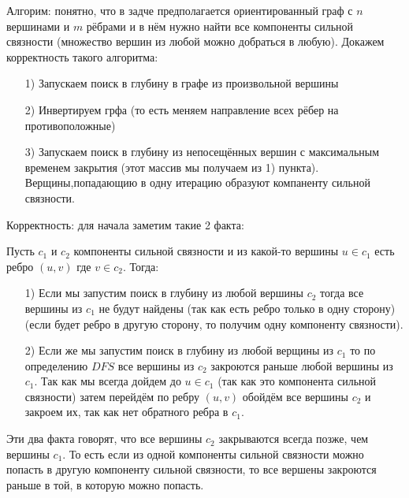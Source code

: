 \documentclass[a4paper,12pt]{article} %
\begin{document}
Алгорим: понятно, что в задче предполагается ориентированный граф с $ n $ вершинами и $ m $ рёбрами и в нём нужно найти все компоненты сильной связности (множество вершин из любой можно добраться в любую). Докажем корректность такого алгоритма:
\begin{itemize}
\item[1) ] Запускаем поиск в глубину в графе из произвольной вершины
\item[2) ] Инвертируем грфа (то есть меняем направление всех рёбер на противоположные)
\item[3) ] Запускаем поиск в глубину из непосещённых вершин с максимальным временем закрытия (этот массив мы получаем из 1) пункта). Верщины,попадающию в одну итерацию образуют компаненту сильной связности. 
\end{itemize}

Корректность: для начала заметим такие 2 факта:
\begin{center}
\end{center}

Пусть $ c_1 $ и $ c_2 $ компоненты сильной связности и из какой-то вершины $ u \in c_1 $ есть ребро $ (u,v) $ где $ v \in c_2 $. Тогда:
\begin{itemize}
\item[1) ]  Если мы запустим поиск в глубину из любой вершины $ c_2 $ тогда все вершины из $ c_1 $ не будут найдены (так как есть ребро только в одну сторону) (если будет ребро в другую сторону, то получим одну компоненту связности).
\item[2) ] Если же мы запустим поиск в глубину из любой верщины из $ c_1 $ то по определению $ DFS $ все вершины из $ c_2 $ закроются раньше любой вершины из $ c_1 $. Так как мы всегда дойдем до $ u \in c_1 $ (так как это компонента сильной связности) затем перейдём по ребру $ (u,v) $ обойдём все вершины $ c_2 $ и закроем их, так как нет обратного ребра в $ c_1 $.
\end{itemize}

Эти два факта говорят, что все вершины $ c_2 $ закрываются всегда позже, чем вершины $ c_1 $. То есть если из одной компоненты сильной связности можно попасть в другую компоненту сильной связности, то все вершены закроются раньше в той, в которую можно попасть.\\
\end{document}
